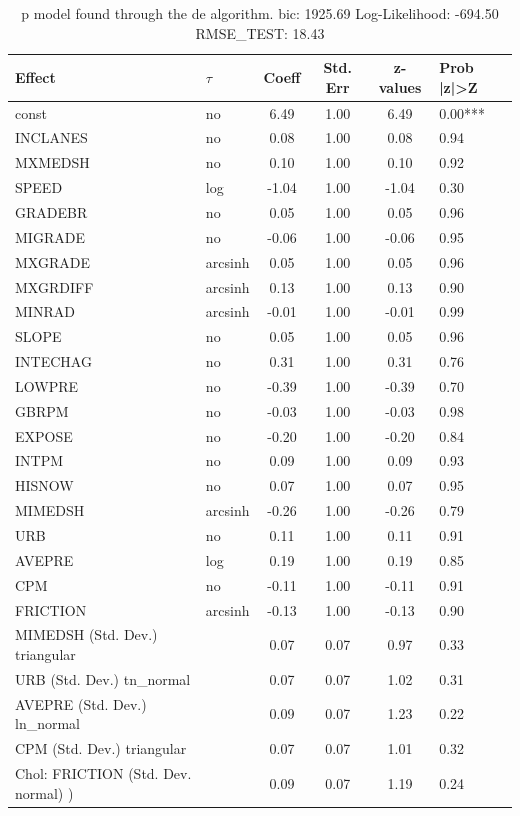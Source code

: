 \begin{table}
	\caption{p model found through the de algorithm. bic: 1925.69 Log-Likelihood: -694.50 RMSE_TEST: 18.43}
	\begin{center}
		\begin{tabular}{|l|l|c|c|c|l|}
			\hline
			Effect & $\tau$ & Coeff & Std. Err & z-values & Prob |z|>Z \\
			\hline
			const & no & 6.49 & 1.00 & 6.49 & 0.00*** \\
			\hline
			INCLANES & no & 0.08 & 1.00 & 0.08 & 0.94 \\
			\hline
			MXMEDSH & no & 0.10 & 1.00 & 0.10 & 0.92 \\
			\hline
			SPEED & log & -1.04 & 1.00 & -1.04 & 0.30 \\
			\hline
			GRADEBR & no & 0.05 & 1.00 & 0.05 & 0.96 \\
			\hline
			MIGRADE & no & -0.06 & 1.00 & -0.06 & 0.95 \\
			\hline
			MXGRADE & arcsinh & 0.05 & 1.00 & 0.05 & 0.96 \\
			\hline
			MXGRDIFF & arcsinh & 0.13 & 1.00 & 0.13 & 0.90 \\
			\hline
			MINRAD & arcsinh & -0.01 & 1.00 & -0.01 & 0.99 \\
			\hline
			SLOPE & no & 0.05 & 1.00 & 0.05 & 0.96 \\
			\hline
			INTECHAG & no & 0.31 & 1.00 & 0.31 & 0.76 \\
			\hline
			LOWPRE & no & -0.39 & 1.00 & -0.39 & 0.70 \\
			\hline
			GBRPM & no & -0.03 & 1.00 & -0.03 & 0.98 \\
			\hline
			EXPOSE & no & -0.20 & 1.00 & -0.20 & 0.84 \\
			\hline
			INTPM & no & 0.09 & 1.00 & 0.09 & 0.93 \\
			\hline
			HISNOW & no & 0.07 & 1.00 & 0.07 & 0.95 \\
			\hline
			MIMEDSH & arcsinh & -0.26 & 1.00 & -0.26 & 0.79 \\
			\hline
			URB & no & 0.11 & 1.00 & 0.11 & 0.91 \\
			\hline
			AVEPRE & log & 0.19 & 1.00 & 0.19 & 0.85 \\
			\hline
			CPM & no & -0.11 & 1.00 & -0.11 & 0.91 \\
			\hline
			FRICTION & arcsinh & -0.13 & 1.00 & -0.13 & 0.90 \\
			\hline
			MIMEDSH (Std. Dev.) triangular &  & 0.07 & 0.07 & 0.97 & 0.33 \\
			\hline
			URB (Std. Dev.) tn_normal &  & 0.07 & 0.07 & 1.02 & 0.31 \\
			\hline
			AVEPRE (Std. Dev.) ln_normal &  & 0.09 & 0.07 & 1.23 & 0.22 \\
			\hline
			CPM (Std. Dev.) triangular &  & 0.07 & 0.07 & 1.01 & 0.32 \\
			\hline
			 Chol: FRICTION (Std. Dev. normal) ) &  & 0.09 & 0.07 & 1.19 & 0.24 \\
			\hline
		\end{tabular}
	\end{center}
\end{table}